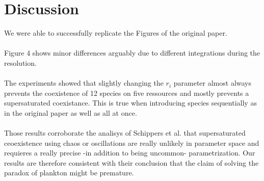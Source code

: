 \section{Discussion}
We were able to successfully replicate the Figures of the original paper.\\ 
\\
Figure 4 shows minor differences arguably due to different integrations during the resolution.\\
\\
The experiments showed that slightly changing the $r_i$ parameter almost always prevents the coexistence of 12 species on five ressources and mostly prevents a supersaturated coexistance. This is true when introducing species sequentially as in the original paper as well as all at once. \\
\\
Those results corroborate the analisys of Schippers et al.\supercite{2008:Schippers} that supersaturated ceoexistence using chaos or oscillations are really unlikely in parameter space and requieres a really precise -in addition to being uncommon- parametrization. Our results are therefore consistent with their conclusion that the claim of solving the paradox of plankton might be premature.



